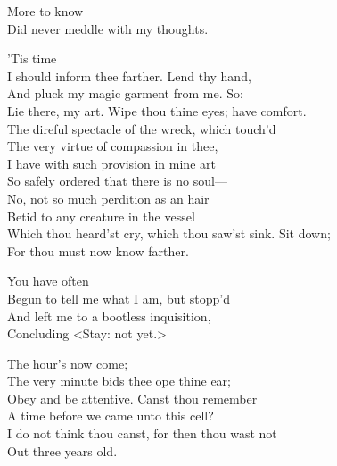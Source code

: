 \begin{verse_speech}[Miranda] 
More to know\\
Did never meddle with my thoughts.
\end{verse_speech}

\begin{verse_speech}[Prospero] 
'Tis time\\
I should inform thee farther. Lend thy hand,\\
And pluck my magic garment from me. So:\\
Lie there, my art. Wipe thou thine eyes; have comfort.\\
The direful spectacle of the wreck, which touch'd\\
The very virtue of compassion in thee,\\
I have with such provision in mine art\\
So safely ordered that there is no soul—\\
No, not so much perdition as an hair\\
Betid to any creature in the vessel\\
Which thou heard'st cry, which thou saw'st sink. Sit down;\\
For thou must now know farther.
\end{verse_speech}


\begin{verse_speech}[Miranda] 
You have often\\
Begun to tell me what I am, but stopp'd\\
And left me to a bootless inquisition,\\
Concluding <Stay: not yet.>
\end{verse_speech}

\begin{verse_speech}[Prospero] 
The hour's now come;\\
The very minute bids thee ope thine ear;\\
Obey and be attentive. Canst thou remember\\
A time before we came unto this cell?\\
I do not think thou canst, for then thou wast not\\
Out three years old.
\end{verse_speech}


